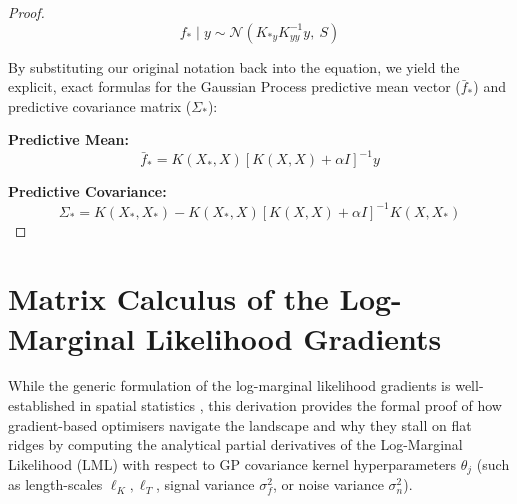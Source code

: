 \documentclass[12pt,oneside]{report}
\theoremstyle{definition}
\theoremstyle{remark}
\begin{document}
\begin{proof}
$$f_* \mid y \sim \mathcal{N}\left(K_{*y}K_{yy}^{-1}y, \ S \right)$$

By substituting our original notation back into the equation, we yield the explicit, exact formulas for the Gaussian Process predictive mean vector ($\bar{f}_*$) and predictive covariance matrix ($\Sigma_*$):

\noindent\textbf{Predictive Mean:} 
\begin{equation}
\bar{f}_* = K(X_*, X) [K(X, X) + \alpha I]^{-1} y
\label{eq:pred_mean_b1}
\end{equation}

\noindent\textbf{Predictive Covariance:} 
\begin{equation}
\Sigma_* = K(X_*, X_*) - K(X_*, X) [K(X, X) + \alpha I]^{-1} K(X, X_*)
\label{eq:pred_covariance_b1}
\end{equation}

\end{proof}

\newpage


\section{Matrix Calculus of the Log-Marginal Likelihood Gradients}
\label{sec:lml_gradients}

While the generic formulation of the log-marginal likelihood gradients is well-established in spatial statistics \citep{rasmussen2006gp}, this derivation provides the formal proof of how gradient-based optimisers navigate the landscape and why they stall on flat ridges by computing the analytical partial derivatives of the Log-Marginal Likelihood (LML) with respect to GP covariance kernel hyperparameters $\theta_j$ (such as length-scales $\ell_K, \ell_T$, signal variance $\sigma_f^2$, or noise variance $\sigma_n^2$).
\end{document}
